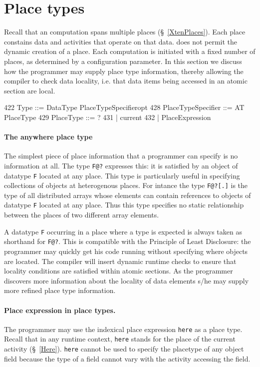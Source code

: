 \section{Place types}\label{PlaceTypes}
Recall that an \Xten{} computation spans multiple places
(\S~\ref{XtenPlaces}). Each place constains data and activities that
operate on that data.  \XtenCurrVer{} does not permit the dynamic
creation of a place. Each \Xten{} computation is initiated with a
fixed number of places, as determined by a configuration parameter.
In this section we discuss how the programmer may supply place type
information, thereby allowing the compiler to check data locality,
i.e.{} that data items being accessed in an atomic section are local.

\begin{x10}
422   Type ::= DataType PlaceTypeSpecifieropt
428   PlaceTypeSpecifier ::= AT PlaceType
429   PlaceType ::= ?
431     | current
432     | PlaceExpression
\end{x10}

\paragraph{The anywhere place type}\label{anywhere}
The simplest piece of place information that a programmer can specify
is no information at all. The type {\tt F@?} expresses this: it is
satisfied by an object of datatype {\tt F} located at any place.  This
type is particularly useful in specifying collections of objects at
heterogenous places. For intance the type {\tt F@?[.]} is the type of
all distributed arrays whose elements can contain references to
objects of datatype {\tt F} located at any place. Thus this type specifies
no static relationship between the places of two different array elements.

A datatype {\tt F} occurring in a place where a type is expected is
always taken as shorthand for {\tt F@?}. This is compatible with the
Principle of Least Disclosure: the programmer may quickly get his code
running without specifying where objects are located. The compiler
will insert dynamic runtime checks to ensure that locality conditions
are satisfied within atomic sections. As the programmer discovers more
information about the locality of data elements s/he may supply more
refined place type information.

\paragraph{Place expression in place types.}
The programmer may use the indexical place expression {\tt here} as a
place type. Recall that in any runtime context, {\tt here} stands for
the place of the current activity (\S~\ref{Here}). {\tt here} cannot
be used to specify the placetype of any object field because the
type of a field cannot vary with the activity accessing the field.


